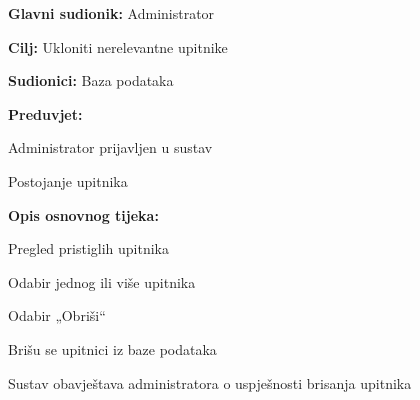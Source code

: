 					\noindent {}
					\begin{packed_item}
	
						\item \textbf{Glavni sudionik:} Administrator
						\item \textbf{Cilj:} Ukloniti nerelevantne upitnike
						\item \textbf{Sudionici:} Baza podataka
						\item \textbf{Preduvjet:} 
						\begin{packed_item}
							\item Administrator prijavljen u sustav
							\item Postojanje upitnika
						\end{packed_item}

						\item \textbf{Opis osnovnog tijeka:}
						
						\item[] \begin{packed_enum}
	
							\item Pregled pristiglih upitnika
							\item Odabir jednog ili više upitnika
							\item Odabir „Obriši“
							\item Brišu se upitnici iz baze podataka
							\item Sustav obavještava administratora o uspješnosti brisanja upitnika
							
						\end{packed_enum}
					\end{packed_item}

